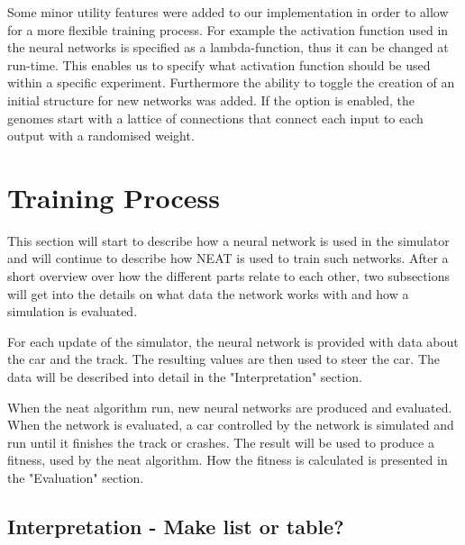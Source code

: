 Some minor utility features were added to our implementation in order to allow for a more flexible training process. For example the activation function used in the neural networks is specified as a lambda-function, thus it can be changed at run-time. This enables us to specify what activation function should be used within a specific experiment. Furthermore the ability to toggle the creation of an initial structure for new networks was added. If the option is enabled, the genomes start with a lattice of connections that connect each input to each output with a randomised weight. 


\section{Training Process}

This section will start to describe how a neural network is used in the simulator and will continue to describe how NEAT is used to train such networks. After a short overview over how the different parts relate to each other, two subsections will get into the details on what data the network works with and how a simulation is evaluated.

For each update of the simulator, the neural network is provided with data about the car and the track. The resulting values are then used to steer the car. The data will be described into detail in the "Interpretation" section.

When the neat algorithm run, new neural networks are produced and evaluated. When the network is evaluated, a car controlled by the network is simulated and run until it finishes the track or crashes. The result will be used to produce a fitness, used by the neat algorithm. How the fitness is calculated is presented in the "Evaluation" section.

\subsection{Interpretation - Make list or table?}

